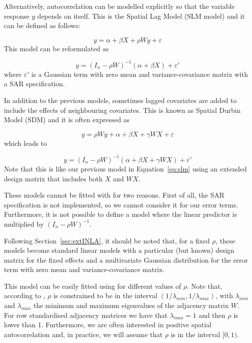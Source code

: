 \documentclass[article]{jss}
\begin{document}
Alternatively, autocorrelation can be modelled explicitly so that the
variable response $y$ depends on itself. This is the Spatial Lag Model
(SLM model) and it can be defined as follows:

\begin{equation}
y= \alpha+\beta X+\rho W y +\varepsilon 
\end{equation}
\noindent
This model can be reformulated as

\begin{equation}
y = (I_n-\rho W)^{-1}(\alpha+\beta X)+\varepsilon ' 
\label{eq:slm}
\end{equation}
\noindent
where $\varepsilon '$ is a Gaussian term with zero mean and
variance-covariance matrix with a SAR specification.

In addition to the previous models, sometimes lagged covariates are 
added to include the effects of neighbouring covariates. This is known
as Spatial Durbin Model (SDM)  and it is often expressed as

\begin{equation}
y= \rho W y+ \alpha+\beta X+\gamma W X +\varepsilon 
\end{equation}
\noindent
which leads to

\begin{equation}
y= (I_n-\rho W)^{-1}(\alpha+\beta X+\gamma W X) +\varepsilon '
\end{equation}
\noindent
Note that this is like our previous model in Equation~\ref{eq:slm} using an extended
design matrix that includes both $X$ and $W X$.

These models cannot be fitted with  for two reasons. First of all, 
the SAR specification is not implemented, so we cannot consider it for our
error terms. Furthermore, it is not possible to define a model 
where the linear predictor is multiplied by $(I_n-\rho W)^{-1}$.

Following Section~\ref{sec:extINLA}, it should be noted that, for a fixed
$\rho$, these models become standard linear models with a particular 
(but known) design matrix for the fixed effects and a multivariate Gaussian
distribution for the error term with zero mean and variance-covariance matrix.

This model can be easily fitted using  for different values
of $\rho$. Note that, according to \citet{Haining:2003}, $\rho$ is constrained 
to be in the interval $(1/\lambda_{min}, 1/\lambda_{max})$, with
$\lambda_{min}$ and $\lambda_{max}$ the minimum and maximum eigenvalues of
the adjacency matrix $W$. For row standardised adjacency matrices we have that
$\lambda_{max}=1$ and then $\rho$ is lower than 1. Furthermore, we are often
interested in positive spatial autocorrelation and, in practice, we will
assume that $\rho$ is in the interval $[0,1)$.
\end{document}
